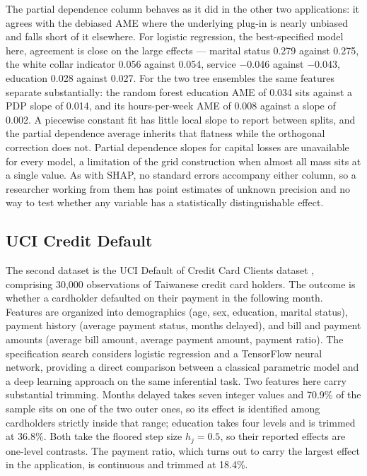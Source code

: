 \documentclass[12pt]{article}
\begin{document}
	The partial dependence column behaves as it did in the other two applications: it agrees with the debiased AME where the underlying plug-in is nearly unbiased and falls short of it elsewhere. For logistic regression, the best-specified model here, agreement is close on the large effects --- marital status 0.279 against 0.275, the white collar indicator 0.056 against 0.054, service $-$0.046 against $-$0.043, education 0.028 against 0.027. For the two tree ensembles the same features separate substantially: the random forest education AME of 0.034 sits against a PDP slope of 0.014, and its hours-per-week AME of 0.008 against a slope of 0.002. A piecewise constant fit has little local slope to report between splits, and the partial dependence average inherits that flatness while the orthogonal correction does not. Partial dependence slopes for capital losses are unavailable for every model, a limitation of the grid construction when almost all mass sits at a single value. As with SHAP, no standard errors accompany either column, so a researcher working from them has point estimates of unknown precision and no way to test whether any variable has a statistically distinguishable effect.
	
	\subsection{UCI Credit Default}
	
	The second dataset is the UCI Default of Credit Card Clients dataset \citep{yeh2009, UCI}, comprising 30,000 observations of Taiwanese credit card holders. The outcome is whether a cardholder defaulted on their payment in the following month. Features are organized into demographics (age, sex, education, marital status), payment history (average payment status, months delayed), and bill and payment amounts (average bill amount, average payment amount, payment ratio). The specification search considers logistic regression and a TensorFlow neural network, providing a direct comparison between a classical parametric model and a deep learning approach on the same inferential task. Two features here carry substantial trimming. Months delayed takes seven integer values and 70.9\% of the sample sits on one of the two outer ones, so its effect is identified among cardholders strictly inside that range; education takes four levels and is trimmed at 36.8\%. Both take the floored step size $h_j = 0.5$, so their reported effects are one-level contrasts. The payment ratio, which turns out to carry the largest effect in the application, is continuous and trimmed at 18.4\%.
	
\end{document}
